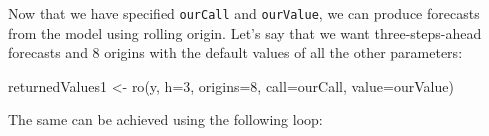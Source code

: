 \documentclass[
]{book}
\newenvironment{Shaded}{\begin{snugshade}}{\end{snugshade}}
\newcommand{\AttributeTok}[1]{\textcolor[rgb]{0.77,0.63,0.00}{#1}}
\newcommand{\DecValTok}[1]{\textcolor[rgb]{0.00,0.00,0.81}{#1}}
\newcommand{\FunctionTok}[1]{\textcolor[rgb]{0.00,0.00,0.00}{#1}}
\newcommand{\NormalTok}[1]{#1}
\newcommand{\OtherTok}[1]{\textcolor[rgb]{0.56,0.35,0.01}{#1}}
\theoremstyle{definition}
\theoremstyle{definition}
\theoremstyle{definition}
\theoremstyle{definition}
\theoremstyle{remark}
\begin{document}
Now that we have specified \texttt{ourCall} and \texttt{ourValue}, we can produce forecasts from the model using rolling origin. Let's say that we want three-steps-ahead forecasts and 8 origins with the default values of all the other parameters:

\begin{Shaded}
\begin{Highlighting}[]
\NormalTok{returnedValues1 }\OtherTok{\textless{}{-}} \FunctionTok{ro}\NormalTok{(y, }\AttributeTok{h=}\DecValTok{3}\NormalTok{, }\AttributeTok{origins=}\DecValTok{8}\NormalTok{,}
                      \AttributeTok{call=}\NormalTok{ourCall, }\AttributeTok{value=}\NormalTok{ourValue)}
\end{Highlighting}
\end{Shaded}

The same can be achieved using the following loop:
\end{document}
